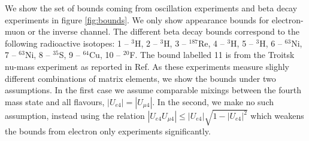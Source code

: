We show the set of bounds coming from oscillation experiments and beta decay experiments in figure \ref{fig:bounds}. We only show appearance bounds for electron-muon or the inverse channel. The different beta decay bounds correspond to the following radioactive isotopes: 1 -- $^3$H, 2 -- $^3$H, 3 -- $^{187}$Re, 4 -- $^3$H, 5 -- $^3$H, 6 -- $^{63}$Ni, 7 -- $^{63}$Ni, 8 -- $^{35}$S, 9 -- $^{64}$Cu, 10 -- $^{20}$F. The bound labelled 11 is from the Troitsk nu-mass experiment as reported in Ref.\cite{Abdurashitov:2017kka}
%
As these experiments measure slighly different combinations of matrix elements, we show the bounds under two assumptions. In the first case we assume comparable mixings between the fourth mass state and all flavours, $|U_{e4}| = |U_{\mu 4}|$. In the second, we make no such assumption, instead using the relation $|U_{e4}U_{\mu 4}|\le |U_{e4}|\sqrt{1-|U_{e4}|^2}$ which weakens the bounds from electron only experiments significantly.

